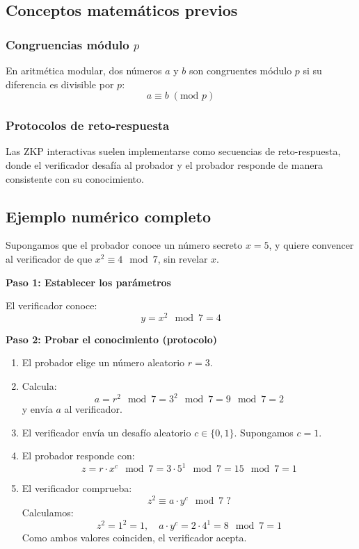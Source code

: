 \documentclass{article}
\begin{document}
\subsection{Conceptos matemáticos previos}

\subsubsection{Congruencias módulo \( p \)}
En aritmética modular, dos números \( a \) y \( b \) son congruentes módulo \( p \) si su diferencia es divisible por \( p \):
\[
a \equiv b \; (\text{mod } p)
\]

\subsubsection{Protocolos de reto-respuesta}
Las ZKP interactivas suelen implementarse como secuencias de reto-respuesta, donde el verificador desafía al probador y el probador responde de manera consistente con su conocimiento.

\subsection{Ejemplo numérico completo}

Supongamos que el probador conoce un número secreto \( x = 5 \), y quiere convencer al verificador de que \( x^2 \equiv 4 \mod 7 \), sin revelar \( x \).

\textbf{Paso 1: Establecer los parámetros}

El verificador conoce:
\[
y = x^2 \mod 7 = 4
\]

\textbf{Paso 2: Probar el conocimiento (protocolo)}

\begin{enumerate}
    \item El probador elige un número aleatorio \( r = 3 \).
    \item Calcula:
    \[
    a = r^2 \mod 7 = 3^2 \mod 7 = 9 \mod 7 = 2
    \]
    y envía \( a \) al verificador.
    \item El verificador envía un desafío aleatorio \( c \in \{0, 1\} \). Supongamos \( c = 1 \).
    \item El probador responde con:
    \[
    z = r \cdot x^c \mod 7 = 3 \cdot 5^1 \mod 7 = 15 \mod 7 = 1
    \]
    \item El verificador comprueba:
    \[
    z^2 \equiv a \cdot y^c \mod 7 \; ?
    \]
    Calculamos:
    \[
    z^2 = 1^2 = 1, \quad a \cdot y^c = 2 \cdot 4^1 = 8 \mod 7 = 1
    \]
    Como ambos valores coinciden, el verificador acepta.
\end{enumerate}
\end{document}
